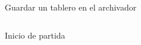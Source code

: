 \begin{frame}
    \begin{columns}
        \column{\dimexpr\paperwidth-10pt}
        \begin{figure}
            \caption{Guardar un tablero en el archivador}
          \end{figure}
      \end{columns}
\end{frame}

\begin{frame}
    \begin{columns}
        \column{\dimexpr\paperwidth-10pt}
        \begin{figure}
            \caption{Inicio de partida}
          \end{figure}
      \end{columns}
\end{frame}

